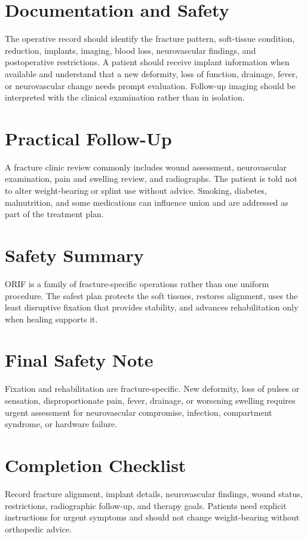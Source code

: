 \section*{Documentation and Safety}
The operative record should identify the fracture pattern, soft-tissue condition, reduction, implants, imaging, blood loss, neurovascular findings, and postoperative restrictions. A patient should receive implant information when available and understand that a new deformity, loss of function, drainage, fever, or neurovascular change needs prompt evaluation. Follow-up imaging should be interpreted with the clinical examination rather than in isolation.

\section*{Practical Follow-Up}
A fracture clinic review commonly includes wound assessment, neurovascular examination, pain and swelling review, and radiographs. The patient is told not to alter weight-bearing or splint use without advice. Smoking, diabetes, malnutrition, and some medications can influence union and are addressed as part of the treatment plan.

\section*{Safety Summary}
ORIF is a family of fracture-specific operations rather than one uniform procedure. The safest plan protects the soft tissues, restores alignment, uses the least disruptive fixation that provides stability, and advances rehabilitation only when healing supports it.

\section*{Final Safety Note}
Fixation and rehabilitation are fracture-specific. New deformity, loss of pulses or sensation, disproportionate pain, fever, drainage, or worsening swelling requires urgent assessment for neurovascular compromise, infection, compartment syndrome, or hardware failure.

\section*{Completion Checklist}
Record fracture alignment, implant details, neurovascular findings, wound status, restrictions, radiographic follow-up, and therapy goals. Patients need explicit instructions for urgent symptoms and should not change weight-bearing without orthopedic advice.

